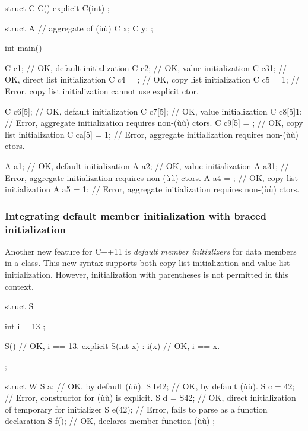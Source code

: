 \begin{emcppslisting}
struct C
{
    C() { }
    explicit C(int) { }
};

struct A  // aggregate of (ù{}ù)
{
    C x;
    C y;
};

int main()
{
    C c1;           // OK, default initialization
    C c2{};         // OK, value initialization
    C c3{1};        // OK, direct list initialization
    C c4 = {};      // OK, copy list initialization
    C c5 = {1};     // Error, copy list initialization cannot use explicit ctor.

    C c6[5];        // OK, default initialization
    C c7[5]{};      // OK, value initialization
    C c8[5]{1};     // Error, aggregate initialization requires non-(ù{}ù) ctors.
    C c9[5] = {};   // OK, copy list initialization
    C ca[5] = {1};  // Error, aggregate initialization requires non-(ù{}ù) ctors.

    A a1;           // OK, default initialization
    A a2{};         // OK, value initialization
    A a3{1};        // Error, aggregate initialization requires non-(ù{}ù) ctors.
    A a4 = {};      // OK, copy list initialization
    A a5 = {1};     // Error, aggregate initialization requires non-(ù{}ù) ctors.
}
\end{emcppslisting}
    

\subsubsection[Integrating default member initialization with braced initialization]{Integrating default member initialization with braced initialization}\label{integrating-default-member-initialization-with-braced-initialization}

Another new feature for C++11 is \emph{default member initializers} for
data members in a class. This new syntax supports both copy list
initialization and value list initialization. However, initialization
with parentheses is not permitted in this context.

\begin{emcppslisting}
struct S
{
    int i = { 13 };

    S() { }                       // OK, i == 13.
    explicit S(int x) : i(x) { }  // OK, i == x.
};


struct W
{
    S a{};        // OK, by default (ù{}ù).
    S b{42};      // OK, by default (ù{}ù).
    S c = {42};   // Error, constructor for (ù{}ù) is explicit.
    S d = S{42};  // OK, direct initialization of temporary for initializer
    S e(42);      // Error, fails to parse as a function declaration
    S f();        // OK, declares member function (ù{}ù)
};
\end{emcppslisting}
    

